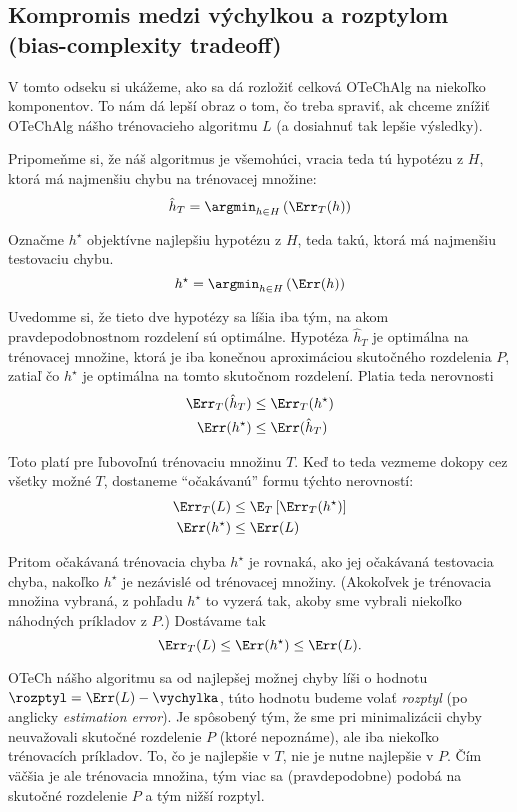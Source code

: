 \subsection{Kompromis medzi výchylkou a rozptylom (bias-complexity tradeoff)}

V tomto odseku si ukážeme, ako sa dá rozložiť celková OTeChAlg na niekoľko
komponentov. To nám dá lepší obraz o tom, čo treba spraviť, ak chceme
znížiť OTeChAlg nášho trénovacieho algoritmu $L$ (a dosiahnuť tak lepšie výsledky).

Pripomeňme si, že náš algoritmus je všemohúci, vracia teda tú hypotézu z $H$,
ktorá má najmenšiu chybu na trénovacej množine:
$$ \hat{h}_T = \argmin_{h \in H} \left( \Err_T(h) \right) $$

Označme $h^\star$ objektívne najlepšiu hypotézu z $H$, teda takú,
ktorá má najmenšiu testovaciu chybu.
$$ h^\star = \argmin_{h \in H} \left( \Err(h) \right) $$

Uvedomme si, že tieto dve hypotézy sa líšia iba tým, na akom
pravdepodobnostnom rozdelení sú optimálne. Hypotéza $\hat{h}_T$
je optimálna na trénovacej množine, ktorá je iba konečnou aproximáciou
skutočného rozdelenia $P$, zatiaľ čo $h^\star$ je optimálna na tomto
skutočnom rozdelení. Platia teda nerovnosti
\begin{align*}
  \Err_T(\hat{h}_T) &\leq \Err_T(h^\star) \\
  \Err(h^\star) &\leq \Err(\hat{h}_T)
\end{align*}

Toto platí pre ľubovoľnú trénovaciu množinu $T$. Keď to teda vezmeme
dokopy cez všetky možné $T$, dostaneme ``očakávanú'' formu týchto
nerovností:
\begin{align*}
  \Err_T(L) &\leq \E_T \left[ \Err_T(h^\star) \right] \\
  \Err(h^\star) &\leq \Err(L)
\end{align*}

Pritom očakávaná trénovacia chyba $h^\star$ je rovnaká, ako jej očakávaná
testovacia chyba, nakoľko $h^\star$ je nezávislé od trénovacej množiny.
(Akokoľvek je trénovacia množina vybraná, z pohľadu $h^\star$ to vyzerá
tak, akoby sme vybrali niekoľko náhodných príkladov z $P$.) Dostávame tak
$$ \Err_T(L) \leq \Err(h^\star) \leq \Err(L). $$

OTeCh nášho algoritmu sa od najlepšej možnej chyby líši o hodnotu
$\rozptyl = \Err(L) - \vychylka$, túto hodnotu budeme volať
\emph{rozptyl} (po anglicky \emph{estimation error}). Je spôsobený tým,
že sme pri minimalizácii chyby neuvažovali skutočné rozdelenie $P$
(ktoré nepoznáme), ale iba niekoľko trénovacích príkladov. To, čo je
najlepšie v $T$, nie je nutne najlepšie v $P$. Čím väčšia je ale
trénovacia množina, tým viac sa (pravdepodobne) podobá na skutočné
rozdelenie $P$ a tým nižší rozptyl.

